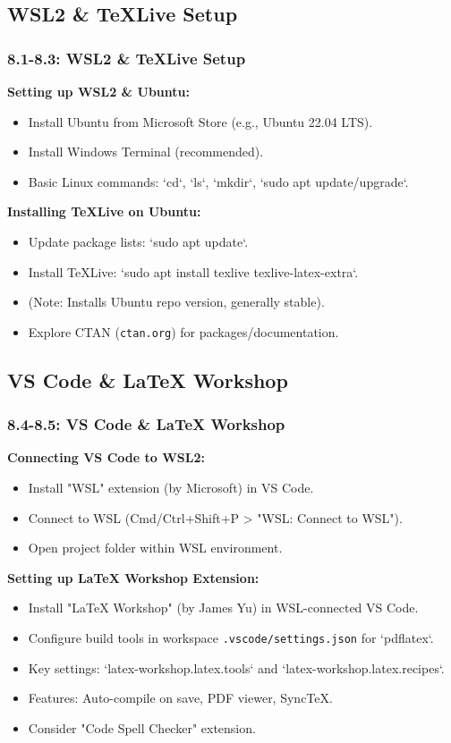 \documentclass{beamer}
\begin{document}
\subsection{WSL2 \& TeXLive Setup}
\begin{frame}
  \frametitle{8.1-8.3: WSL2 \& TeXLive Setup}
  \textbf{Setting up WSL2 \& Ubuntu:}
  \begin{itemize}
    \item Install Ubuntu from Microsoft Store (e.g., Ubuntu 22.04 LTS).
    \item Install Windows Terminal (recommended).
    \item Basic Linux commands: `cd`, `ls`, `mkdir`, `sudo apt update/upgrade`.
  \end{itemize}
  \pause
  \textbf{Installing TeXLive on Ubuntu:}
  \begin{itemize}
    \item Update package lists: `sudo apt update`.
    \item Install TeXLive: `sudo apt install texlive texlive-latex-extra`.
    \item (Note: Installs Ubuntu repo version, generally stable).
    \item Explore CTAN (\texttt{ctan.org}) for packages/documentation.
  \end{itemize}
\end{frame}

\subsection{VS Code \& LaTeX Workshop}
\begin{frame}[fragile]
  \frametitle{8.4-8.5: VS Code \& LaTeX Workshop}
  \textbf{Connecting VS Code to WSL2:}
  \begin{itemize}
    \item Install "WSL" extension (by Microsoft) in VS Code.
    \item Connect to WSL (Cmd/Ctrl+Shift+P > "WSL: Connect to WSL").
    \item Open project folder within WSL environment.
  \end{itemize}
  \pause
  \textbf{Setting up LaTeX Workshop Extension:}
  \begin{itemize}
    \item Install "LaTeX Workshop" (by James Yu) in WSL-connected VS Code.
    \item Configure build tools in workspace \texttt{.vscode/settings.json} for `pdflatex`.
    \item Key settings: `latex-workshop.latex.tools` and `latex-workshop.latex.recipes`.
    \item Features: Auto-compile on save, PDF viewer, SyncTeX.
    \item Consider "Code Spell Checker" extension.
  \end{itemize}
\end{frame}
\end{document}

